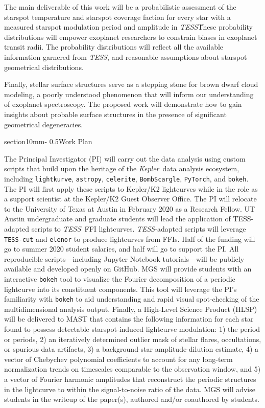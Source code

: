 \documentclass[letterpaper,11pt]{article}
\makeatletter
\renewcommand{\section}{\@startsection%
{section}{1}{0mm}{-\baselineskip}%
{0.5\baselineskip}{\normalfont\Large\bfseries}}%
\newcommand{\tess}{{\it TESS}}
\newcommand{\kepler}{{\it Kepler}}
\makeatother
\begin{document}
The main deliverable of this work will be a probabilistic assessment of the starspot temperature and starspot coverage faction for every star with a measured starspot modulation period and amplitude in \tess\.  These probability distributions will empower exoplanet researchers to constrain biases in exoplanet transit radii.  The probability distributions will reflect all the available information garnered from \tess, and reasonable assumptions about starspot geometrical distributions.

Finally, stellar surface structures serve as a stepping stone for brown dwarf cloud modeling, a poorly understood phenomenon that will inform our understanding of exoplanet spectroscopy.  The proposed work will demonstrate how to gain insights about probable surface structures in the presence of significant geometrical degeneracies.


\section{Work Plan}

The Principal Investigator (PI) will carry out the data analysis using custom scripts that build upon the heritage of the \kepler\ data analysis ecosystem, including \texttt{lightkurve}, \texttt{astropy}, \texttt{celerite}, \texttt{BombScargle}, \texttt{PyTorch}, and \texttt{bokeh}.  The PI will first apply these scripts to Kepler/K2 lightcurves while in the role as a support scientist at the Kepler/K2 Guest Observer Office.  The PI will relocate to the University of Texas at Austin in February 2020 as a Research Fellow.  UT Austin undergraduate and graduate students will lead the application of TESS-adapted scripts to \tess\ FFI lightcurves.  \tess-adapted scripts will leverage \texttt{TESS-cut} and \texttt{elenor} to produce lightcurves from FFIs.  Half of the funding will go to summer 2020 student salaries, and half will go to support the PI.  All reproducible scripts---including Jupyter Notebook tutorials---will be publicly available and developed openly on GitHub.  MGS will provide students with an interactive \texttt{bokeh} tool to visualize the Fourier decomposition of a periodic lightcurve into its constituent components.  This tool will leverage the PI's familiarity with \texttt{bokeh} to aid understanding and rapid visual spot-checking of the multidimensional analysis output.  Finally, a High-Level Science Product (HLSP) will be delivered to MAST that contains the following information for each star found to possess detectable starspot-induced lightcurve modulation: 1) the period or periods, 2) an iteratively determined outlier mask of stellar flares, occultations, or spurious data artifacts, 3) a background-star amplitude-dilution estimate, 4) a vector of Chebychev polynomial coefficients to account for any long-term normalization trends on timescales comparable to the observation window, and 5) a vector of Fourier harmonic amplitudes that reconstruct the periodic structures in the lightcurve to within the signal-to-noise ratio of the data.  MGS will advise students in the writeup of the paper(s), authored and/or coauthored by students.


\end{document}
